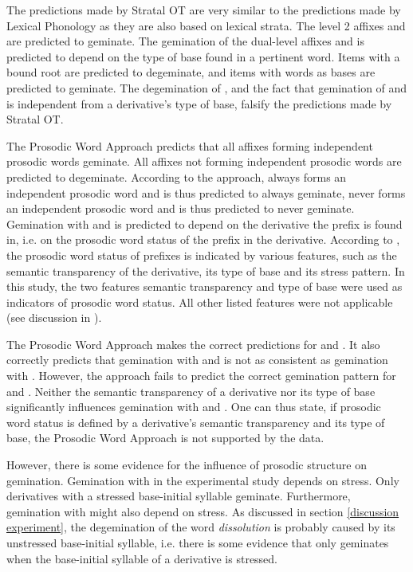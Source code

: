 The predictions made by Stratal OT are very similar to the predictions made by Lexical Phonology as they are also based on lexical strata. 
The level 2 affixes  and  are predicted to geminate. The gemination of the dual-level affixes  and  is predicted to depend on the type of base found in a pertinent word. Items with a bound root are predicted to degeminate, and items with words as bases are predicted to geminate. The degemination of , and the fact that gemination of  and  is independent from a derivative's type of base, falsify the predictions made by Stratal OT.  

The Prosodic Word Approach predicts that all affixes forming independent prosodic words geminate. All affixes not forming independent prosodic words are predicted to degeminate. According to the approach,  always forms an independent prosodic word and is thus predicted to always geminate,  never forms an independent prosodic word and is thus predicted to never geminate. Gemination with  and  is predicted to depend on the derivative the prefix is found in, i.e. on the prosodic word status of the prefix in the  derivative. 
According to \cite{Raffelsiefen.1999}, the prosodic word status of prefixes is indicated by various features, such as the semantic transparency of the derivative, its type of base and its stress pattern. In this study, the two features semantic transparency and type of base were used as indicators of prosodic word status. All other listed features were not applicable (see discussion in ). 

The Prosodic Word Approach  makes the correct predictions for  and . It also correctly predicts that gemination with  and  is not as consistent as gemination with . However, the approach fails to predict the correct gemination pattern for  and . 
 Neither the semantic transparency of a derivative nor its type of base significantly influences gemination with  and .
One can thus state, if prosodic word status is defined by a derivative's semantic transparency and its type of base, the Prosodic Word Approach is not supported by the data.


However, there is some evidence 
for the influence of prosodic structure on gemination. 
Gemination with  in the experimental study depends on stress. Only derivatives with a stressed base-initial syllable geminate. Furthermore, gemination with  might also depend on stress. As discussed in section  \ref{discussion experiment}, the degemination of the word \textit{dissolution} is probably caused by its unstressed base-initial syllable, i.e. there is some evidence that  only geminates when the base-initial syllable of a derivative is stressed. 

